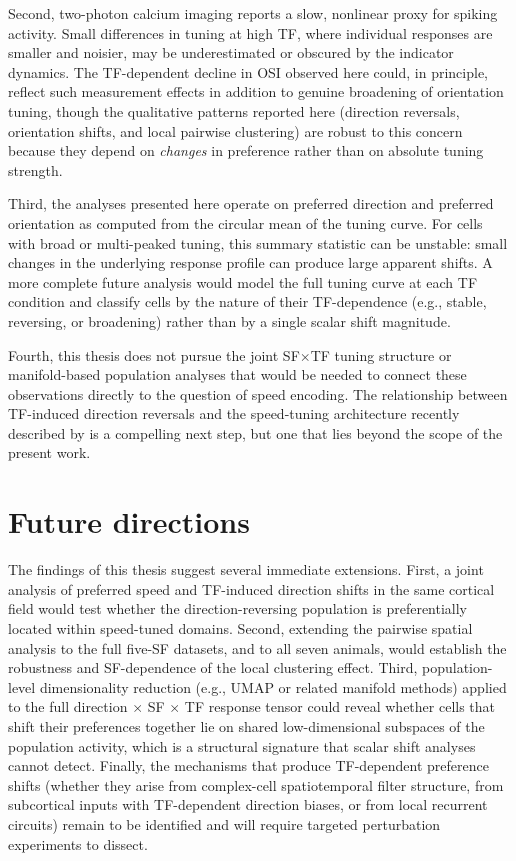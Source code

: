 \documentclass{brandeis-thesis3.3}
\begin{document}
Second, two-photon calcium imaging reports a slow, nonlinear
proxy for spiking activity. Small differences in tuning at
high TF, where individual responses are smaller and noisier,
may be underestimated or obscured by the indicator dynamics.
The TF-dependent decline in OSI observed here could, in
principle, reflect such measurement effects in addition to
genuine broadening of orientation tuning, though the
qualitative patterns reported here (direction reversals,
orientation shifts, and local pairwise clustering) are robust
to this concern because they depend on \textit{changes} in
preference rather than on absolute tuning strength.

Third, the analyses presented here operate on preferred
direction and preferred orientation as computed from the
circular mean of the tuning curve. For cells with broad or
multi-peaked tuning, this summary statistic can be unstable:
small changes in the underlying response profile can produce
large apparent shifts. A more complete future analysis would
model the full tuning curve at each TF condition and classify
cells by the nature of their TF-dependence (e.g., stable,
reversing, or broadening) rather than by a single scalar shift
magnitude.

Fourth, this thesis does not pursue the joint SF$\times$TF
tuning structure or manifold-based population analyses that
would be needed to connect these observations directly to the
question of speed encoding. The relationship between
TF-induced direction reversals and the speed-tuning
architecture recently described by \citet{Casanova2025} is a
compelling next step, but one that lies beyond the scope of
the present work.

\section{Future directions}

The findings of this thesis suggest several immediate
extensions. First, a joint analysis of preferred speed and
TF-induced direction shifts in the same cortical field would
test whether the direction-reversing population is
preferentially located within speed-tuned domains. Second,
extending the pairwise spatial analysis to the full five-SF
datasets, and to all seven animals, would establish the
robustness and SF-dependence of the local clustering effect.
Third, population-level dimensionality reduction (e.g., UMAP
or related manifold methods) applied to the full direction
$\times$ SF $\times$ TF response tensor could reveal whether
cells that shift their preferences together lie on shared
low-dimensional subspaces of the population activity, which is a
structural signature that scalar shift analyses cannot detect.
Finally, the mechanisms that produce TF-dependent preference
shifts (whether they arise from complex-cell spatiotemporal
filter structure, from subcortical inputs with TF-dependent
direction biases, or from local recurrent circuits) remain 
to be identified and will require targeted perturbation
experiments to dissect.
\end{document}
